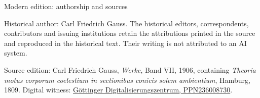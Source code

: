 \clearpage
\thispagestyle{empty}
\begingroup
\pagestyle{empty}
\footnotesize\raggedright
\enlargethispage{2\baselineskip}
\setlength{\parindent}{0pt}\setlength{\parskip}{.5\baselineskip}
{\large Modern edition: authorship and sources\par}
Historical author: Carl Friedrich Gauss. The historical editors, correspondents, contributors and issuing institutions retain the attributions printed in the source and reproduced in the historical text. Their writing is not attributed to an AI system.

Source edition: Carl Friedrich Gauss, \emph{Werke}, Band VII, 1906, containing \emph{Theoria motus corporum coelestium in sectionibus conicis solem ambientium}, Hamburg, 1809. Digital witness: \href{https://gdz.sub.uni-goettingen.de/id/PPN236008730}{Göttinger Digitalisierungszentrum, PPN236008730}.


